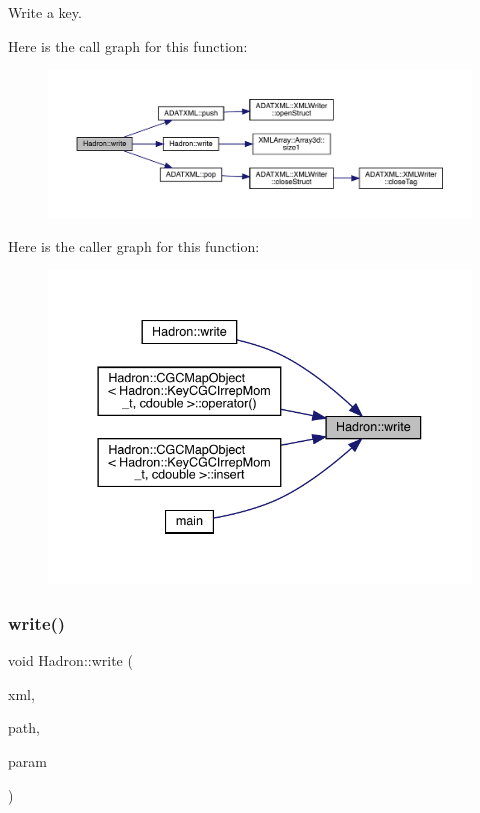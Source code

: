 Write a key. 

Here is the call graph for this function\+:
\nopagebreak
\begin{figure}[H]
\begin{center}
\leavevmode
\includegraphics[width=350pt]{d1/daf/namespaceHadron_ac358b1203bd94f6b26452402911ce174_cgraph}
\end{center}
\end{figure}
Here is the caller graph for this function\+:
\nopagebreak
\begin{figure}[H]
\begin{center}
\leavevmode
\includegraphics[width=337pt]{d1/daf/namespaceHadron_ac358b1203bd94f6b26452402911ce174_icgraph}
\end{center}
\end{figure}
\mbox{\label{namespaceHadron_a4ae7852bf18d56cb1a966ce318245ea6}} 
\subsubsection{\texorpdfstring{write()}{write()}\hspace{0.1cm}{\footnotesize\ttfamily [25/95]}}
{\footnotesize\ttfamily void Hadron\+::write (\begin{DoxyParamCaption}\item[{\mbox{\hyperlink{classADATXML_1_1XMLWriter}{X\+M\+L\+Writer}} \&}]{xml,  }\item[{const std\+::string \&}]{path,  }\item[{const \mbox{\hyperlink{structHadron_1_1KeyGlueElementalOperator__t}{Key\+Glue\+Elemental\+Operator\+\_\+t}} \&}]{param }\end{DoxyParamCaption})}



